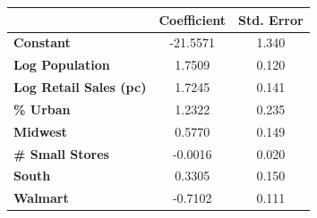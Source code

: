 \begin{center}
\begin{tabular}{lcc}
                                & \textbf{Coefficient} & \textbf{Std. Error} \\
\midrule
\textbf{Constant}              &     -21.5571  &        1.340   \\
\textbf{Log Population}        &       1.7509  &        0.120   \\
\textbf{Log Retail Sales (pc)} &       1.7245  &        0.141   \\
\textbf{\% Urban}              &       1.2322  &        0.235   \\
\textbf{Midwest}               &       0.5770  &        0.149   \\
\textbf{\# Small Stores}       &      -0.0016  &        0.020   \\
\textbf{South}                 &       0.3305  &        0.150   \\
\textbf{Walmart} &      -0.7102  &        0.111   \\
\bottomrule
\end{tabular}
\end{center}

